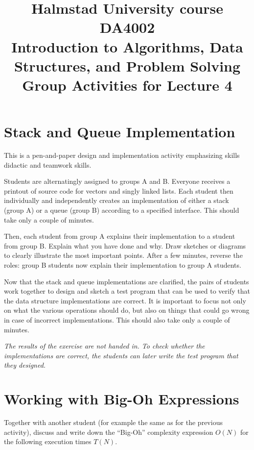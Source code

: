 \documentclass[a4paper]{article}
\begin{document}
\title{
  {\small
    Halmstad University course DA4002\\
    Introduction to Algorithms, Data Structures, and Problem Solving\\
  }
  Group Activities for Lecture 4
}
\maketitle



\section{Stack and Queue Implementation}

This is a pen-and-paper design and implementation activity emphasizing skills didactic and teamwork skills.

Students are alternatingly assigned to groups A and B.
Everyone receives a printout of source code for vectors and singly linked lists.
Each student then individually and independently creates an implementation of either a stack (group A) or a queue (group B) according to a specified interface.
This should take only a couple of minutes.

Then, each student from group A explains their implementation to a student from group B.
Explain what you have done and why.
Draw sketches or diagrams to clearly illustrate the most important points.
After a few minutes, reverse the roles:
group B students now explain their implementation to group A students.

Now that the stack and queue implementations are clarified, the pairs of students work together to design and sketch a test program that can be used to verify that the data structure implementations are correct.
It is important to focus not only on what the various operations should do, but also on things that could go wrong in case of incorrect implementations.
This should also take only a couple of minutes.

\emph{The results of the exercise are not handed in.
  To check whether the implementations are correct, the students can later write the test program that they designed.}



\section{Working with Big-Oh Expressions}

Together with another student (for example the same as for the previous activity), discuss and write down the ``Big-Oh'' complexity expression $O(N)$ for the following execution times $T(N)$.
\end{document}
